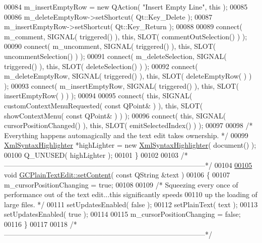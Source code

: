 \begin{DoxyCode}
00084   m\_insertEmptyRow = \textcolor{keyword}{new} QAction( \textcolor{stringliteral}{"Insert Empty Line"}, \textcolor{keyword}{this} );
00085 
00086   m\_deleteEmptyRow->setShortcut( Qt::Key\_Delete );
00087   m\_insertEmptyRow->setShortcut( Qt::Key\_Return );
00088 
00089   connect( m\_comment, SIGNAL( triggered() ), \textcolor{keyword}{this}, SLOT( commentOutSelection() 
      ) );
00090   connect( m\_uncomment, SIGNAL( triggered() ), \textcolor{keyword}{this}, SLOT( uncommentSelection()
       ) );
00091   connect( m\_deleteSelection, SIGNAL( triggered() ), \textcolor{keyword}{this}, SLOT( 
      deleteSelection() ) );
00092   connect( m\_deleteEmptyRow, SIGNAL( triggered() ), \textcolor{keyword}{this}, SLOT( deleteEmptyRow(
      ) ) );
00093   connect( m\_insertEmptyRow, SIGNAL( triggered() ), \textcolor{keyword}{this}, SLOT( insertEmptyRow(
      ) ) );
00094 
00095   connect( \textcolor{keyword}{this}, SIGNAL( customContextMenuRequested( \textcolor{keyword}{const} QPoint& ) ), \textcolor{keyword}{this}, 
      SLOT( showContextMenu( \textcolor{keyword}{const} QPoint& ) ) );
00096   connect( \textcolor{keyword}{this}, SIGNAL( cursorPositionChanged() ), \textcolor{keyword}{this}, SLOT( 
      emitSelectedIndex() ) );
00097 
00098   \textcolor{comment}{/* Everything happens automagically and the text edit takes ownership. */}
00099   \hyperlink{class_xml_syntax_highlighter}{XmlSyntaxHighlighter} *highLighter = \textcolor{keyword}{new} \hyperlink{class_xml_syntax_highlighter}{XmlSyntaxHighlighter}( document() );
00100   Q\_UNUSED( highLighter );
00101 \}
00102 
00103 \textcolor{comment}{/*
      --------------------------------------------------------------------------------------*/}
00104 
\hypertarget{gcplaintextedit_8cpp_source_l00105}{}\hyperlink{class_g_c_plain_text_edit_af658d66d1fe8c1885d708de16b115b0f}{00105} \textcolor{keywordtype}{void} \hyperlink{class_g_c_plain_text_edit_af658d66d1fe8c1885d708de16b115b0f}{GCPlainTextEdit::setContent}( \textcolor{keyword}{const} QString &text )
00106 \{
00107   m\_cursorPositionChanging = \textcolor{keyword}{true};
00108 
00109   \textcolor{comment}{/* Squeezing every once of performance out of the text edit...this
       significantly speeds}
00110 \textcolor{comment}{    up the loading of large files. */}
00111   setUpdatesEnabled( \textcolor{keyword}{false} );
00112   setPlainText( text );
00113   setUpdatesEnabled( \textcolor{keyword}{true} );
00114 
00115   m\_cursorPositionChanging = \textcolor{keyword}{false};
00116 \}
00117 
00118 \textcolor{comment}{/*
      --------------------------------------------------------------------------------------*/}

\end{DoxyCode}
